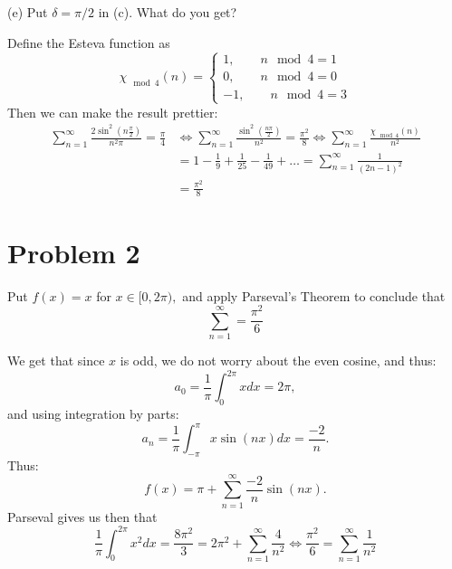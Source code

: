 \documentclass[11pt]{article}
\begin{document}
\begin{itemize}
\begin{problem}
    \item[(e)] Put \( \delta = \pi/2 \) in (c). What do you get?
        \end{problem}
\begin{solution}
Define the Esteva function as 
\[\chi_{\mod 4}(n) = \begin{cases}
    1, \qquad n\mod 4 = 1\\
    0, \qquad n\mod 4 = 0\\
    -1, \qquad n\mod 4 = 3
\end{cases}\]
Then we can make the result prettier:
\begin{align*}
    \sum_{n=1}^\infty \frac{2\sin^2(n\frac{\pi}{2})}{n^2 \pi} = \frac{\pi}{4} &\iff \sum_{n=1}^\infty \frac{\sin^2(\frac{n\pi}{2})}{n^2} = \frac{\pi^2}{8} \iff \sum_{n=1}^\infty \frac{\chi_{\mod 4}(n)}{n^2}\\ &= 1 -\frac{1}{9} + \frac{1}{25} - \frac{1}{49} + \dots = \sum_{n=1}^\infty \frac{1}{(2n-1)^2}\\ &= 
    \frac{\pi^2}{8}
\end{align*}
    
\end{solution}
\end{itemize}
\newpage
\section*{Problem 2}
\begin{problem}
    Put $f(x) = x$ for $x\in [0,2\pi),$ and apply Parseval's Theorem to conclude that 
    \[\sum_{n=1}^\infty = \frac{\pi^2}{6}\]
\end{problem}
\begin{solution}
    We get that since $x$ is odd, we do not worry about the even cosine, and thus:
    \[a_0 = \frac{1}{\pi}\int_{0}^{2\pi} x dx = 2\pi,\]
    and using integration by parts:
    \[a_n = \frac{1}{\pi}\int_{-\pi}^\pi x\sin(nx)dx = \frac{-2}{n}.\] Thus:
    \[f(x) = \pi + \sum_{n=1}^\infty \frac{-2}{n}\sin(nx).\] Parseval gives us then that 
    \[\frac{1}{\pi}\int_{0}^{2\pi} x^2dx = \frac{8\pi^2}{3}= 2\pi^2 + \sum_{n=1}^\infty \frac{4}{n^2} \iff \frac{\pi^2}{6} = \sum_{n=1}^\infty \frac{1}{n^2}\]
\end{solution}
\newpage
\end{document}
